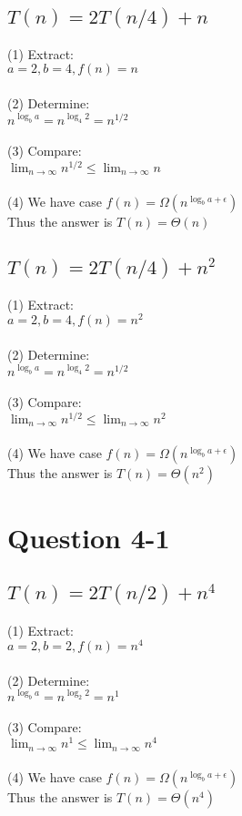\documentclass[20pt]{article} %
\begin{document}
\newpage
\subsection{$T(n) = 2T(n/4) + n$}

(1) Extract:
\\ \indent $a = 2, b = 4, f(n) = n$ 
\\ \\
(2) Determine:
\\ \indent $n^{\log_b a} = n^{\log_4 2} = n^{1 / 2}$ 
\\ \\
(3) Compare:
\\ \indent $\lim_{n\to\infty} n^{1 / 2} \leq \lim_{n\to\infty}n$
\\ \\
(4) We have case $f(n) = \Omega(n^{\log_b a + \epsilon})$
\\ Thus the answer is $T(n) = \Theta(n)$

\subsection{$T(n) = 2T(n/4) + n^2$}

(1) Extract:
\\ \indent $a = 2, b = 4, f(n) = n^{2}$ 
\\ \\
(2) Determine:
\\ \indent $n^{\log_b a} = n^{\log_4 2} = n^{1 / 2}$ 
\\ \\
(3) Compare:
\\ \indent $\lim_{n\to\infty} n^{1 / 2} \leq \lim_{n\to\infty}n^{2}$
\\ \\
(4) We have case $f(n) = \Omega(n^{\log_b a + \epsilon})$
\\ Thus the answer is $T(n) = \Theta(n^{2})$

\newpage
\section{Question 4-1}
\subsection{$T(n) = 2T(n/2) + n^{4}$}

(1) Extract:
\\ \indent $a = 2, b = 2, f(n) = n^{4}$ 
\\ \\
(2) Determine:
\\ \indent $n^{\log_b a} = n^{\log_2 2} = n^{1}$
\\ \\
(3) Compare:
\\ \indent $\lim_{n\to\infty} n^{1} \leq \lim_{n\to\infty}n^{4}$
\\ \\
(4) We have case $f(n) = \Omega(n^{\log_b a + \epsilon})$
\\ Thus the answer is $T(n) = \Theta(n^{4})$
\end{document}
